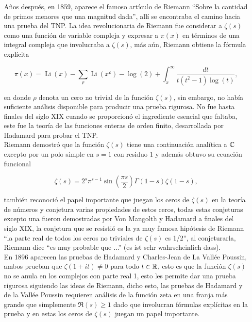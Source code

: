 Años después, en 1859, aparece el famoso artículo de Riemann ``Sobre la cantidad de primos menores que una magnitud dada'', allí se encontraba el camino hacia una prueba del TNP. La idea revolucionaria de Riemann fue considerar a $\zeta(s)$ como una función de variable compleja y expresar a $\pi(x)$ en términos de una integral compleja que involucraba a $\zeta(s)$, más aún, Riemann obtiene la fórmula explícita

$$\pi(x)=\operatorname{Li}(x)-\sum_\rho \operatorname{Li}\left(x^\rho\right)-\log (2)+\int_x^{\infty} \frac{d t}{t\left(t^2-1\right) \log (t)},$$

en donde $\rho$ denota un cero no trivial de la función $\zeta(s)$, sin embargo, no había suficiente análisis disponible para producir una prueba rigurosa. No fue hasta finales del siglo XIX cuando se proporcionó el ingrediente esencial que faltaba, este fue la teoría de las funciones enteras de orden finito, desarrollada por Hadamard para probar el TNP.\\

Riemann demostró que la función $\zeta(s)$ tiene una continuación analítica a $\mathbb{C}$ excepto por un polo simple en $s=1$ con residuo 1 y además obtuvo su ecuación funcional 

\[
\zeta(s) = 2^s \pi^{s-1} \sin\left(\frac{\pi s}{2}\right) \Gamma(1-s) \zeta(1-s),
\]

también reconoció el papel importante que juegan los ceros de $\zeta(s)$ en la teoría de números y conjetura varias propiedades de estos ceros, todas estas conjeturas excepto una fueron demostradas por Von Mangolth y Hadamard a finales del siglo XIX, la conjetura que se resistió es la ya muy famosa hipótesis de Riemann ``la parte real de todos los ceros no triviales de $\zeta(s)$ es 1/2'', al conjeturarla, Riemann dice ``es muy probable que ...'' (es ist sehr wahrscheinlich dass).\cite{bateman1996hundred}\\

En 1896 aparecen las pruebas de Hadamard y Charles-Jean de La Vallée Poussin, ambos prueban que $\zeta(1+it)\neq 0$ para todo $t\in \mathbb{R}$, esto es que la función $\zeta(s)$ no se anula en los complejos con parte real 1, esto les permite dar una prueba rigurosa siguiendo las ideas de Riemann, dicho esto, las pruebas de Hadamard y de la Vallée Poussin requieren análisis de la función zeta en una franja más grande que simplemente $\Re(s)\geq 1$ dado que involucran fórmulas explícitas en la prueba y en estas los ceros de $\zeta(s)$ juegan un papel importante.\\

